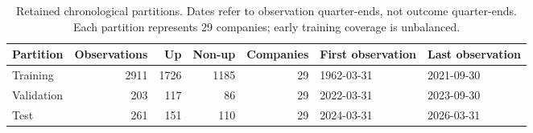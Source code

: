 \begin{table}[t]
\centering\small
\caption{Retained chronological partitions. Dates refer to observation quarter-ends, not outcome quarter-ends. Each partition represents 29 companies; early training coverage is unbalanced.}\label{tab:split}
\begin{tabular}{lrrrrll}
\toprule
Partition & Observations & Up & Non-up & Companies & First observation & Last observation \\
\midrule
Training & 2911 & 1726 & 1185 & 29 & 1962-03-31 & 2021-09-30 \\
Validation & 203 & 117 & 86 & 29 & 2022-03-31 & 2023-09-30 \\
Test & 261 & 151 & 110 & 29 & 2024-03-31 & 2026-03-31 \\
\bottomrule
\end{tabular}
\end{table}
